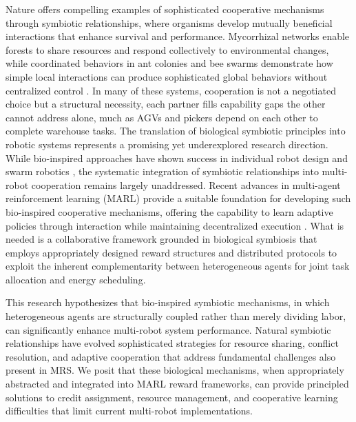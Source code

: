 \documentclass[Afour,sageh,times]{sagej}
\begin{document}
Nature offers compelling examples of sophisticated cooperative mechanisms through symbiotic relationships, where organisms develop mutually beneficial interactions that enhance survival and performance. Mycorrhizal networks enable forests to share resources and respond collectively to environmental changes, while coordinated behaviors in ant colonies and bee swarms demonstrate how simple local interactions can produce sophisticated global behaviors without centralized control \citep{simard2012Mycorrhizal, bonabeau1999Swarm}. In many of these systems, cooperation is not a negotiated choice but a structural necessity, each partner fills capability gaps the other cannot address alone, much as AGVs and pickers depend on each other to complete warehouse tasks. The translation of biological symbiotic principles into robotic systems represents a promising yet underexplored research direction. While bio-inspired approaches have shown success in individual robot design and swarm robotics \citep{brambilla2013Swarm}, the systematic integration of symbiotic relationships into multi-robot cooperation remains largely unaddressed. Recent advances in multi-agent reinforcement learning (MARL) provide a suitable foundation for developing such bio-inspired cooperative mechanisms, offering the capability to learn adaptive policies through interaction while maintaining decentralized execution \citep{foerster2018Counterfactuala}. What is needed is a collaborative framework grounded in biological symbiosis that employs appropriately designed reward structures and distributed protocols to exploit the inherent complementarity between heterogeneous agents for joint task allocation and energy scheduling.

This research hypothesizes that bio-inspired symbiotic mechanisms, in which heterogeneous agents are structurally coupled rather than merely dividing labor, can significantly enhance multi-robot system performance. Natural symbiotic relationships have evolved sophisticated strategies for resource sharing, conflict resolution, and adaptive cooperation that address fundamental challenges also present in MRS. We posit that these biological mechanisms, when appropriately abstracted and integrated into MARL reward frameworks, can provide principled solutions to credit assignment, resource management, and cooperative learning difficulties that limit current multi-robot implementations.
\end{document}
